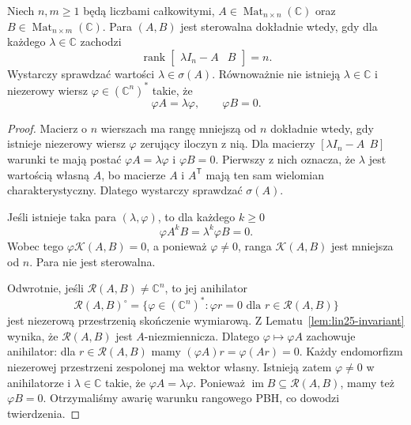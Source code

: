 \begin{twierdzenie}
\label{thm:lin25-pbh}
Niech \(n,m\ge1\) będą liczbami całkowitymi,
\(A\in\operatorname{Mat}_{n\times n}(\mathbb C)\)
oraz \(B\in\operatorname{Mat}_{n\times m}(\mathbb C)\).
Para \((A,B)\)
jest sterowalna dokładnie wtedy,
gdy dla każdego
\(\lambda\in\mathbb C\)
zachodzi
\[
 \operatorname{rank}
 \begin{bmatrix}\lambda I_n-A&B\end{bmatrix}=n.
\]
Wystarczy sprawdzać wartości
\(\lambda\in\sigma(A)\).
Równoważnie nie istnieją
\(\lambda\in\mathbb C\)
i niezerowy wiersz
\(\varphi\in(\mathbb C^n)^*\)
takie, że
\[
 \varphi A=\lambda\varphi,
 \qquad \varphi B=0.
\]
\end{twierdzenie}
\begin{proof}
Macierz o \(n\) wierszach
ma rangę mniejszą od \(n\)
dokładnie wtedy, gdy istnieje
niezerowy wiersz \(\varphi\)
zerujący iloczyn z nią.
Dla macierzy
\([\lambda I_n-A\ \ B]\)
warunki te mają postać
\(\varphi A=\lambda\varphi\)
i \(\varphi B=0\).
Pierwszy z nich oznacza,
że \(\lambda\) jest wartością
własną \(A\), bo macierze
\(A\) i \(A^{\mathsf T}\)
mają ten sam wielomian
charakterystyczny.
Dlatego wystarczy
sprawdzać \(\sigma(A)\).

Jeśli istnieje taka para
\((\lambda,\varphi)\),
to dla każdego \(k\ge0\)
\[
 \varphi A^kB
 =\lambda^k\varphi B=0.
\]
Wobec tego
\(\varphi\mathcal K(A,B)=0\),
a ponieważ \(\varphi\ne0\),
ranga \(\mathcal K(A,B)\)
jest mniejsza od \(n\).
Para nie jest sterowalna.

Odwrotnie, jeśli
\(\mathcal R(A,B)\ne\mathbb C^n\),
to jej anihilator
\[
 \mathcal R(A,B)^\circ
 =\{\varphi\in(\mathbb C^n)^*:
        \varphi r=0\text{ dla }r\in\mathcal R(A,B)\}
\]
jest niezerową przestrzenią
skończenie wymiarową.
Z Lematu~\ref{lem:lin25-invariant}
wynika, że \(\mathcal R(A,B)\)
jest \(A\)-niezmiennicza.
Dlatego
\(\varphi\mapsto\varphi A\)
zachowuje anihilator:
dla \(r\in\mathcal R(A,B)\)
mamy
\((\varphi A)r=\varphi(Ar)=0\).
Każdy endomorfizm niezerowej
przestrzeni zespolonej
ma wektor własny.
Istnieją zatem
\(\varphi\ne0\) w anihilatorze
i \(\lambda\in\mathbb C\)
takie, że
\(\varphi A=\lambda\varphi\).
Ponieważ \(\operatorname{im}B
 \subseteq\mathcal R(A,B)\),
mamy też \(\varphi B=0\).
Otrzymaliśmy awarię
warunku rangowego PBH,
co dowodzi twierdzenia.
\end{proof}

